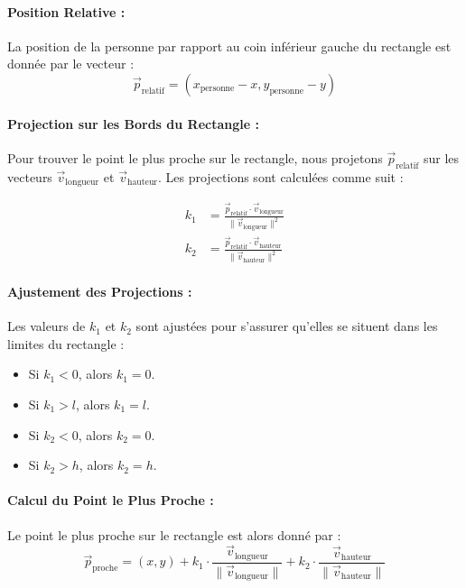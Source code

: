 \documentclass[a4paper,12pt]{article}
\begin{document}
\paragraph{Position Relative :}

La position de la personne par rapport au coin inférieur gauche du rectangle est donnée par le vecteur :
\[
\vec{p}_{\text{relatif}} = (x_{\text{personne}} - x, y_{\text{personne}} - y)
\]

\paragraph{Projection sur les Bords du Rectangle :}

Pour trouver le point le plus proche sur le rectangle, nous projetons $\vec{p}_{\text{relatif}}$ sur les vecteurs $\vec{v}_{\text{longueur}}$ et $\vec{v}_{\text{hauteur}}$. Les projections sont calculées comme suit :

\begin{align*}
k_1 &= \frac{\vec{p}_{\text{relatif}} \cdot \vec{v}_{\text{longueur}}}{\|\vec{v}_{\text{longueur}}\|^2} \\
k_2 &= \frac{\vec{p}_{\text{relatif}} \cdot \vec{v}_{\text{hauteur}}}{\|\vec{v}_{\text{hauteur}}\|^2}
\end{align*}

\paragraph{Ajustement des Projections :}

Les valeurs de $k_1$ et $k_2$ sont ajustées pour s'assurer qu'elles se situent dans les limites du rectangle :
\begin{itemize}
    \item Si $k_1 < 0$, alors $k_1 = 0$.
    \item Si $k_1 > l$, alors $k_1 = l$.
    \item Si $k_2 < 0$, alors $k_2 = 0$.
    \item Si $k_2 > h$, alors $k_2 = h$.
\end{itemize}

\paragraph{Calcul du Point le Plus Proche :}

Le point le plus proche sur le rectangle est alors donné par :
\[
\vec{p}_{\text{proche}} = (x, y) + k_1 \cdot \frac{\vec{v}_{\text{longueur}}}{\|\vec{v}_{\text{longueur}}\|} + k_2 \cdot \frac{\vec{v}_{\text{hauteur}}}{\|\vec{v}_{\text{hauteur}}\|}
\]
\end{document}
